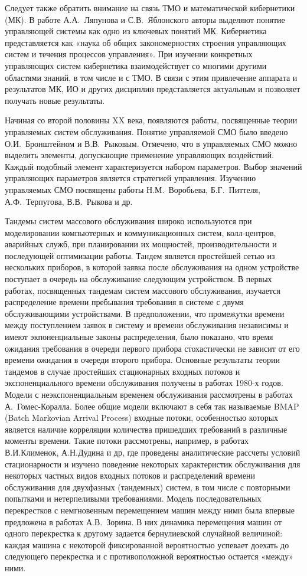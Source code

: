 \documentclass[14pt]{extarticle}
\theoremstyle{theorem}
\theoremstyle{remark}
\begin{document}
Следует также обратить внимание на связь ТМО и математической кибернетики (МК). В работе А.А.~Ляпунова и С.В.~Яблонского авторы выделяют понятие управляющей системы как одно из ключевых понятий МК. Кибернетика представляется как «наука об общих закономерностях строения управляющих систем и течения процессов управления». При изучении конкретных управляющих систем кибернетика взаимодействует со многими другими областями знаний, в том числе и с ТМО. В связи с этим привлечение аппарата и результатов МК, ИО и других дисциплин представляется актуальным и позволяет получать новые результаты.

Начиная со второй половины XX века, появляются работы, посвященные теории управляемых систем обслуживания. Понятие управляемой СМО было введено О.И.~Бронштейном и В.В.~Рыковым. Отмечено, что в управляемых СМО можно выделить элементы, допускающие применение управляющих воздействий.  Каждый подобный элемент характеризуется набором параметров. Выбор значений управляющих параметров является стратегией управления. Изучению управляемых СМО  посвящены работы Н.М.~Воробьева, Б.Г.~Питтеля, А.Ф.~Терпугова, В.В.~Рыкова и др.

Тандемы систем массового обслуживания широко используются при моделировании компьютерных и коммуникационных систем, колл-центров, аварийных служб,
при планировании их мощностей, производительности и последующей оптимизации
работы. Тандем является простейшей сетью из нескольких приборов, в которой заявка после обслуживания на одном устройстве поступает в очередь на обслуживание следующим устройством. В первых работах, посвященных тандемам систем массового обслуживания, изучается распределение времени пребывания требования в системе с двумя обслуживающими устройствами. В
предположении, что промежутки времени между поступлением заявок в систему и
времени обслуживания независимы и имеют экпоненциальные законы распределения,
было показано, что время ожидания требования в очереди первого прибора стохастически не зависит от его времени ожидания в очереди второго прибора.
Основные результаты теории тандемов в случае простейших стационарных входных потоков и экспоненциального времени обслуживания получены в работах 1980-х годов. Модели с неэкспоненциальным временем обслуживания
рассмотрены в работах А.~Гомес-Коралла. Более общие модели включают в себя так называемые BMAP
(Batch Markovian Arrival Process) входные потоки, особенностью которых является
наличие корреляции количества пришедших требований в различные моменты времени. Такие потоки рассмотрены, например, в работах В.И.Клименок, А.Н.Дудина и др, где проведены аналитические рассчеты условий стационарности и изучено поведение некоторых характеристик обслуживания для некоторых частных видов входных потоков и распределений времени обслуживания для двухфазных (тандемных) систем, в том числе
с повторными попытками и нетерпеливыми требованиями. Модель последовательных перекрестков с немгновенным перемещением машин между ними была впервые
предложена в работах А.В.~Зорина. В них динамика перемещения машин
от одного перекрестка к другому задается бернулиевской случайной величиной: каждая машина с некоторой фиксированной вероятностью успевает доехать до
следующего перекрестка и с противоположной вероятностью остается «между»
ними.
\end{document}
